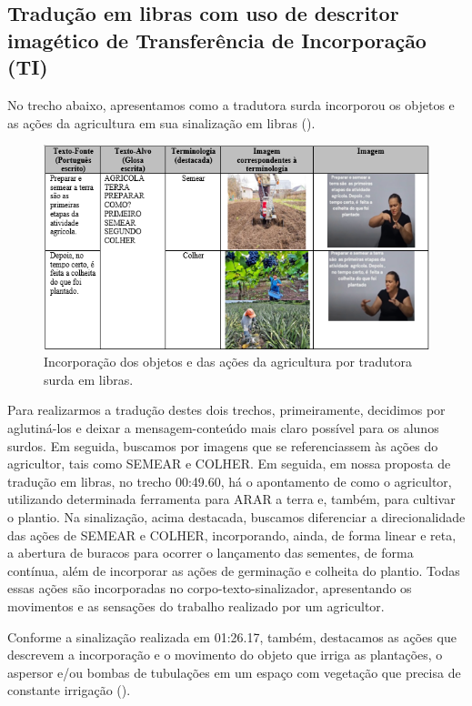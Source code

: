 \documentclass[portuguese]{textolivre}
\begin{document}
\subsection{Tradução em libras com uso de descritor imagético de Transferência de Incorporação (TI)}\label{sec-idioma}
No trecho abaixo, apresentamos como a tradutora surda incorporou os objetos e as ações da agricultura em sua sinalização em libras (). 

\begin{figure}[h!]
    \centering
    \begin{minipage}{.85\textwidth} 
    \includegraphics[width=\linewidth]{Fig12.png}
    \caption{Incorporação dos objetos e das ações da agricultura por tradutora surda em libras.}
    \label{fig12}
    \end{minipage}
\end{figure}

Para realizarmos a tradução destes dois trechos, primeiramente, decidimos por aglutiná-los e deixar a mensagem-conteúdo mais claro possível para os alunos surdos. Em seguida, buscamos por imagens que se referenciassem às ações do agricultor, tais como SEMEAR e COLHER. Em seguida, em nossa proposta de tradução em libras, no trecho 00:49.60, há o apontamento de como o agricultor, utilizando determinada ferramenta para ARAR a terra e, também, para cultivar o plantio. Na sinalização, acima destacada, buscamos diferenciar a direcionalidade das ações de SEMEAR e COLHER, incorporando, ainda, de forma linear e reta, a abertura de buracos para ocorrer o lançamento das sementes, de forma contínua, além de incorporar as ações de germinação e colheita do plantio. Todas essas ações são incorporadas no corpo-texto-sinalizador, apresentando os movimentos e as sensações do trabalho realizado por um agricultor.

Conforme a sinalização realizada em 01:26.17, também, destacamos as ações que descrevem a incorporação e o movimento do objeto que irriga as plantações, o aspersor e/ou bombas de tubulações em um espaço com vegetação que precisa de constante irrigação (). 
\end{document}
